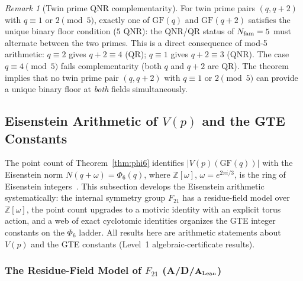 \documentclass[11pt]{article}
\theoremstyle{remark}
\newtheorem{remark}[theorem]{Remark}
\newcommand{\GF}[1]{\ensuremath{\mathrm{GF}(#1)}}
\newcommand{\CatAL}{\texorpdfstring{\ensuremath{\textbf{A}_{\rm Lean}}}{A-Lean}}
\newcommand{\CatAD}{\textbf{A/D}}
\begin{document}
\begin{remark}[Twin prime QNR complementarity]
\label{rem:twinprime}
For twin prime pairs $(q, q+2)$ with $q \equiv 1$ or $2 \pmod{5}$,
exactly one of $\GF{q}$ and $\GF{q+2}$ satisfies the unique binary floor
condition ($5$ QNR): the QNR/QR status of $N_{\rm fam} = 5$ must alternate
between the two primes.
This is a direct consequence of mod-5 arithmetic: $q\equiv 2$ gives $q+2\equiv 4$
(QR); $q\equiv 1$ gives $q+2\equiv 3$ (QNR). The case $q\equiv 4\pmod5$
fails complementarity (both $q$ and $q+2$ are QR).
The theorem implies that no twin prime pair $(q,q+2)$ with $q\equiv 1$ or $2\pmod5$
can provide a unique binary floor at \emph{both} fields simultaneously.
\end{remark}

\subsection{Eisenstein Arithmetic of \texorpdfstring{$V(p)$}{V(p)} and the
GTE Constants}
\label{subsec:eisenstein}

The point count of Theorem~\ref{thm:phi6} identifies $|V(p)(\GF{q})|$ with
the Eisenstein norm $N(q+\omega) = \Phi_6(q)$, where
$\mathbb{Z}[\omega]$, $\omega = e^{2\pi i/3}$, is the ring of Eisenstein
integers~\cite{IrelandRosen1990}. This subsection develops the Eisenstein
arithmetic systematically: the internal symmetry group $F_{21}$ has a
residue-field model over $\mathbb{Z}[\omega]$, the point count upgrades to a
motivic identity with an explicit torus action, and a web of exact
cyclotomic identities organizes the GTE integer constants on the $\Phi_6$
ladder. All results here are arithmetic statements about $V(p)$ and the GTE
constants (Level~1 algebraic-certificate results).

\subsubsection{The Residue-Field Model of
\texorpdfstring{$F_{21}$}{F21} (\CatAD{}/\CatAL{})}
\end{document}
